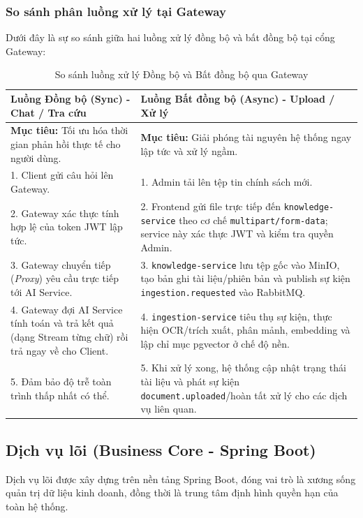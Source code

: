 \documentclass[12pt,a4paper]{report}
\begin{document}
\subsubsection{So sánh phân luồng xử lý tại Gateway}
Dưới đây là sự so sánh giữa hai luồng xử lý đồng bộ và bất đồng bộ tại cổng Gateway:

\begin{table}[H]
\centering
\small
\begin{tabularx}{\textwidth}{|X|X|}
\hline
\rowcolor{gray!10}
\textbf{Luồng Đồng bộ (Sync) - Chat / Tra cứu} & \textbf{Luồng Bất đồng bộ (Async) - Upload / Xử lý} \\ \hline
\textbf{Mục tiêu:} Tối ưu hóa thời gian phản hồi thực tế cho người dùng. & \textbf{Mục tiêu:} Giải phóng tài nguyên hệ thống ngay lập tức và xử lý ngầm. \\ \hline
1. Client gửi câu hỏi lên Gateway. & 1. Admin tải lên tệp tin chính sách mới. \\ \hline
2. Gateway xác thực tính hợp lệ của token JWT lập tức. & 2. Frontend gửi file trực tiếp đến \texttt{knowledge-service} theo cơ chế \texttt{multipart/form-data}; service này xác thực JWT và kiểm tra quyền Admin. \\ \hline
3. Gateway chuyển tiếp (\textit{Proxy}) yêu cầu trực tiếp tới AI Service. & 3. \texttt{knowledge-service} lưu tệp gốc vào MinIO, tạo bản ghi tài liệu/phiên bản và publish sự kiện \texttt{ingestion.requested} vào RabbitMQ. \\ \hline
4. Gateway đợi AI Service tính toán và trả kết quả (dạng Stream từng chữ) rồi trả ngay về cho Client. & 4. \texttt{ingestion-service} tiêu thụ sự kiện, thực hiện OCR/trích xuất, phân mảnh, embedding và lập chỉ mục pgvector ở chế độ nền. \\ \hline
5. Đảm bảo độ trễ toàn trình thấp nhất có thể. & 5. Khi xử lý xong, hệ thống cập nhật trạng thái tài liệu và phát sự kiện \texttt{document.uploaded}/hoàn tất xử lý cho các dịch vụ liên quan. \\ \hline
\end{tabularx}
\caption{So sánh luồng xử lý Đồng bộ và Bất đồng bộ qua Gateway}
\label{tab:gateway_sync_async}
\end{table}

\subsection{Dịch vụ lõi (Business Core - Spring Boot)}
Dịch vụ lõi được xây dựng trên nền tảng Spring Boot, đóng vai trò là xương sống quản trị dữ liệu kinh doanh, đồng thời là trung tâm định hình quyền hạn của toàn hệ thống.
\end{document}
